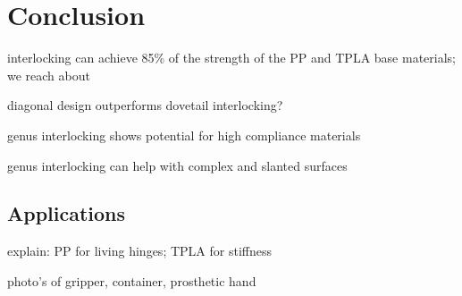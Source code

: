 \section{Conclusion}

interlocking can achieve 85\% of the strength of the PP and TPLA base materials; we reach about 

diagonal design outperforms dovetail interlocking?

genus interlocking shows potential for high compliance materials

genus interlocking can help with complex and slanted surfaces 


\subsection{Applications}
explain: PP for living hinges; TPLA for stiffness


photo's of gripper, container, prosthetic hand 



